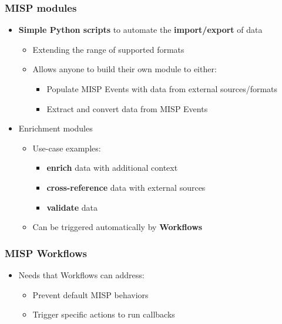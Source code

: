 \begin{frame}
    \frametitle{MISP modules}
    \begin{itemize}
        \item \textbf{Simple Python scripts} to automate the \textbf{import/export} of data
        \begin{itemize}
            \item Extending the range of supported formats
            \item Allows anyone to build their own module to either:
            \begin{itemize}
                \item Populate MISP Events with data from external sources/formats
                \item Extract and convert data from MISP Events
            \end{itemize}
        \end{itemize}
        \item Enrichment modules
        \begin{itemize}
            \item Use-case examples:
            \begin{itemize}
                \item \textbf{enrich} data with additional context
                \item \textbf{cross-reference} data with external sources
                \item \textbf{validate} data
            \end{itemize}
            \item Can be triggered automatically by \textbf{Workflows}
        \end{itemize}
    \end{itemize}
\end{frame}

\begin{frame}
    \frametitle{MISP Workflows}
    \begin{itemize}
        \item Needs that Workflows can address:
        \begin{itemize}
            \item Prevent default MISP behaviors
            \item Trigger specific actions to run callbacks
        \end{itemize}
    \end{itemize}
    \begin{center}
    \end{center}
\end{frame}

